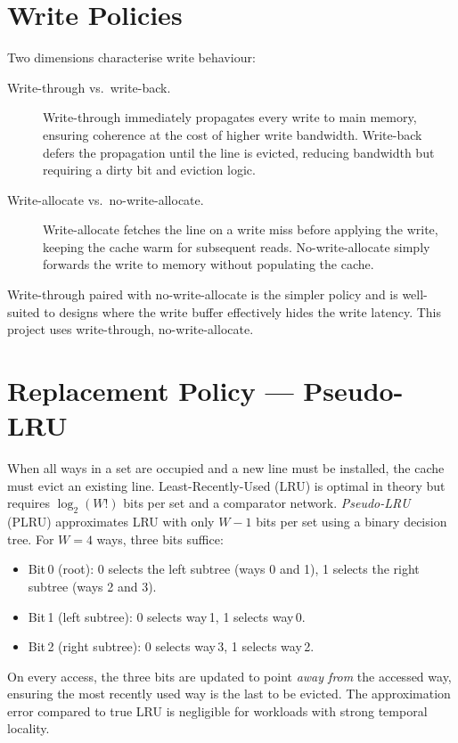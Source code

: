 \documentclass[12pt,letterpaper]{report}
\begin{document}
\section{Write Policies}

Two dimensions characterise write behaviour:

\begin{description}
  \item[Write-through vs.\ write-back.]  Write-through immediately
        propagates every write to main memory, ensuring coherence at
        the cost of higher write bandwidth.  Write-back defers the
        propagation until the line is evicted, reducing bandwidth but
        requiring a dirty bit and eviction logic.
  \item[Write-allocate vs.\ no-write-allocate.]  Write-allocate
        fetches the line on a write miss before applying the write,
        keeping the cache warm for subsequent reads.
        No-write-allocate simply forwards the write to memory without
        populating the cache.
\end{description}

Write-through paired with no-write-allocate is the simpler policy and
is well-suited to designs where the write buffer effectively hides the
write latency.  This project uses write-through, no-write-allocate.

\section{Replacement Policy — Pseudo-LRU}

When all ways in a set are occupied and a new line must be installed,
the cache must evict an existing line.  Least-Recently-Used (LRU) is
optimal in theory but requires $\log_2(W!)$ bits per set and a
comparator network.  \emph{Pseudo-LRU} (PLRU) approximates LRU with
only $W{-}1$ bits per set using a binary decision tree.  For $W{=}4$
ways, three bits suffice:

\begin{itemize}
  \item Bit\,0 (root): 0 selects the left subtree (ways 0 and 1),
        1 selects the right subtree (ways 2 and 3).
  \item Bit\,1 (left subtree): 0 selects way\,1, 1 selects way\,0.
  \item Bit\,2 (right subtree): 0 selects way\,3, 1 selects way\,2.
\end{itemize}

On every access, the three bits are updated to point \emph{away from}
the accessed way, ensuring the most recently used way is the last to be
evicted.  The approximation error compared to true LRU is negligible
for workloads with strong temporal locality.
\end{document}
